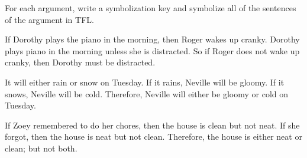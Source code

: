 \problempart
For each argument, write a symbolization key and symbolize all of the sentences of the argument in TFL.
\begin{earg}
\item If Dorothy plays the piano in the morning, then Roger wakes up cranky. Dorothy plays piano in the morning unless she is distracted. So if Roger does not wake up cranky, then Dorothy must be distracted.
\item[] 
\bigskip

\item It will either rain or snow on Tuesday. If it rains, Neville will be gloomy. If it snows, Neville will be cold. Therefore, Neville will either be gloomy or cold on Tuesday.
\item[] 
\bigskip

\item If Zoey remembered to do her chores, then the house is clean but not neat. If she forgot, then the house is neat but not clean. Therefore, the house is either neat or clean; but not both.
\item[] 
\end{earg}



